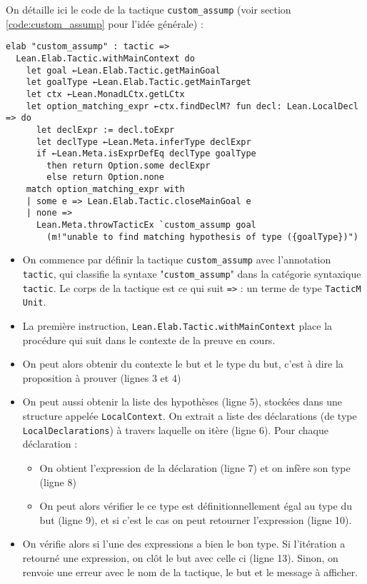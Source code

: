 \documentclass[a4paper, 12pt]{article}
\newcommand{\lean}[1]{\texttt{#1}}
\begin{document}
On détaille ici le code de la tactique \lean{custom_assump} (voir section \ref{code:custom_assump} pour l'idée générale) :

\begin{verbatim}
elab "custom_assump" : tactic =>
  Lean.Elab.Tactic.withMainContext do
    let goal ←Lean.Elab.Tactic.getMainGoal
    let goalType ←Lean.Elab.Tactic.getMainTarget
    let ctx ←Lean.MonadLCtx.getLCtx
    let option_matching_expr ←ctx.findDeclM? fun decl: Lean.LocalDecl => do
      let declExpr := decl.toExpr
      let declType ←Lean.Meta.inferType declExpr
      if ←Lean.Meta.isExprDefEq declType goalType
        then return Option.some declExpr
        else return Option.none
    match option_matching_expr with
    | some e => Lean.Elab.Tactic.closeMainGoal e
    | none =>
      Lean.Meta.throwTacticEx `custom_assump goal
        (m!"unable to find matching hypothesis of type ({goalType})")
\end{verbatim}

\begin{itemize}
    \item On commence par définir la tactique \lean{custom_assump} avec l'annotation \lean{tactic}, qui classifie la syntaxe "\lean{custom_assump}" dans la catégorie syntaxique \lean{tactic}. Le corps de la tactique est ce qui suit \lean{=>} : un terme de type \lean{TacticM Unit}.
    \item La première instruction, \lean{Lean.Elab.Tactic.withMainContext} place la procédure qui suit dans le contexte de la preuve en cours.
    \item On peut alors obtenir du contexte le but et le type du but, c'est à dire la proposition à prouver (lignes 3 et 4)
    \item On peut aussi obtenir la liste des hypothèses (ligne 5), stockées dans une structure appelée \lean{LocalContext}. On extrait a liste des déclarations (de type \lean{LocalDeclarations}) à travers laquelle on itère (ligne 6). Pour chaque déclaration :
        \begin{itemize}
            \item On obtient l'expression de la déclaration (ligne 7) et on infère son type (ligne 8)
            \item On peut alors vérifier le ce type est définitionnellement égal au type du but (ligne 9), et si c'est le cas on peut retourner l'expression (ligne 10).
        \end{itemize}
    \item On vérifie alors si l'une des expressions a bien le bon type. Si l'itération a retourné une expression, on clôt le but avec celle ci (ligne 13). Sinon, on renvoie une erreur avec le nom de la tactique, le but et le message à afficher.
\end{itemize}


\newpage

\nocite{*}


\end{document}
